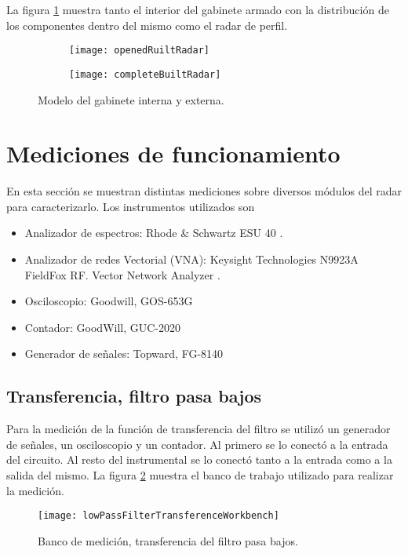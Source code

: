 La figura \ref{fig:completeRadar} muestra tanto el interior del gabinete armado con la distribución de los componentes dentro del mismo como el radar de perfil.

\begin{figure}[H]
 \centering
 \begin{subfigure}[t]{0.8\textwidth}
    \texttt{[image: openedRuiltRadar]}
  \end{subfigure}

  \begin{subfigure}[t]{0.5\textwidth}
    \texttt{[image: completeBuiltRadar]}
  \end{subfigure}
 \caption{Modelo del gabinete interna y externa.}
 \label{fig:completeRadar}
\end{figure}


\section{Mediciones de funcionamiento}

En esta sección se muestran distintas mediciones sobre diversos módulos del radar para caracterizarlo.
Los instrumentos utilizados son
\begin{itemize}
  \item Analizador de espectros: Rhode \& Schwartz ESU 40 \cite{spectrumAnalyzer}.
  \item Analizador de redes Vectorial (VNA): Keysight Technologies N9923A FieldFox RF.
Vector Network Analyzer \cite{VNA}.
  \item Osciloscopio: Goodwill, GOS-653G
  \item Contador: GoodWill, GUC-2020
  \item Generador de señales: Topward, FG-8140
\end{itemize}

\subsection{Transferencia, filtro pasa bajos}

Para la medición de la función de transferencia del filtro se utilizó un generador de señales, un osciloscopio y un contador. Al primero se lo conectó a la entrada del circuito. Al resto del instrumental se lo conectó tanto a la entrada como a la salida del mismo. La figura \ref{fig:lowPassFilterConnections} muestra el banco de trabajo utilizado para realizar la medición.

\begin{figure}[H]
 \centering
 \texttt{[image: lowPassFilterTransferenceWorkbench]}
 \caption{Banco de medición, transferencia del filtro pasa bajos.}
 \label{fig:lowPassFilterConnections}
\end{figure}

